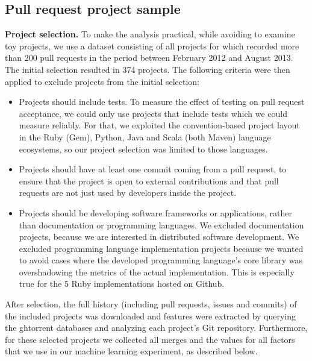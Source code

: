 \documentclass{sig-alternate}
\begin{document}
\subsection{Pull request project sample}
\label{sec:expdata} 

\textbf{Project selection.} To make the analysis practical, while avoiding to
examine toy projects, we use a dataset consisting of all projects for which
\ghtorrent recorded more than 200 pull requests in the period between February
2012 and August 2013. The initial selection resulted in 374 projects. The
following criteria were then applied to exclude projects from the initial
selection:

\begin{itemize}

  \item Projects should include tests. To measure the effect of testing on pull
    request acceptance, we could only use projects that include tests which we
    could measure reliably. For that, we exploited the convention-based project
    layout in the Ruby (Gem), Python, Java and Scala (both Maven) language
    ecosystems, so our project selection was limited to those languages. 

  \item Projects should have at least one commit coming from a pull request, to
    ensure that the project is open to external contributions and that pull
    requests are not just used by developers inside the project.

  \item Projects should be developing software frameworks or applications,
    rather than documentation or programming languages. We excluded
    documentation projects, because we are interested in distributed software
    development. We excluded programming language implementation projects
    because we wanted to avoid cases where the developed programming language's
    core library was overshadowing the metrics of the actual implementation.
    This is especially true for the 5 Ruby implementations hosted on Github.

\end{itemize}

After selection, the full history (including pull requests, issues and commits)
of the included projects was downloaded and features were extracted by querying
the {\sc ght}orrent databases and analyzing each project's Git repository. 
Furthermore, for these selected projects we collected all merges and the values for all factors that we use in our machine learning experiment, as described below.
\end{document}
